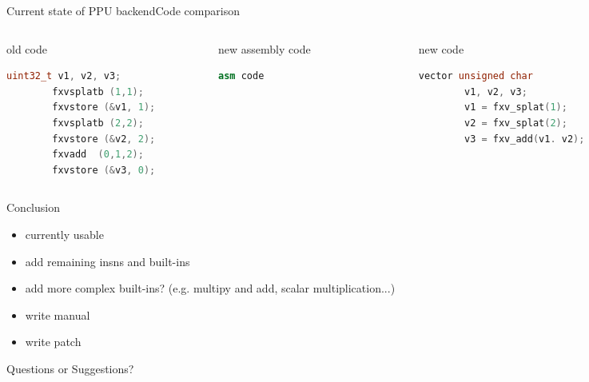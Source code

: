 \documentclass[10pt]{beamer}
\begin{document}
\begin{frame}[fragile]{Current state of PPU backend}{Code comparison}
\begin{columns}[t]
	\begin{column}{0.3\textwidth}
      \begin{block}{old code}
       \begin{lstlisting}[language=C++,basicstyle=\ttfamily\scriptsize,keywordstyle=\color{red}]
		uint32_t v1, v2, v3;
		fxvsplatb (1,1);
		fxvstore (&v1, 1);
		fxvsplatb (2,2);
		fxvstore (&v2, 2);
		fxvadd 	(0,1,2);
		fxvstore (&v3, 0);
		\end{lstlisting}
      \end{block}
    \end{column}    
    \begin{column}{0.3\textwidth}
      \begin{block}{new assembly code}
        \begin{lstlisting}[language=C++,basicstyle=\ttfamily\scriptsize,keywordstyle=\color{red}]
		asm code				
	\end{lstlisting}
      \end{block}
    \end{column}
    \begin{column}{0.3\textwidth}
      \begin{block}{new code}
        \begin{lstlisting}[language=C++,basicstyle=\ttfamily\scriptsize,keywordstyle=\color{red}]
		vector unsigned char
		v1, v2, v3;
		v1 = fxv_splat(1);
		v2 = fxv_splat(2);	
		v3 = fxv_add(v1. v2);			
	\end{lstlisting}
      \end{block}
    \end{column}
\end{columns}
\end{frame}

\begin{frame}{Conclusion}
	\begin{itemize}
		\item currently usable
		\item add remaining insns and built-ins
		\item add more complex built-ins? (e.g. multipy and add, scalar multiplication...)
		\item write manual
		\item write patch
	\end{itemize}
\end{frame}

\begin{frame}[plain,c]
\begin{center}
\Huge Questions or Suggestions?
\end{center}
\end{frame}
\end{document}
